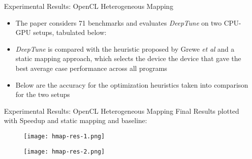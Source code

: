 \documentclass[10pt]{beamer}
\begin{document}
\begin{frame}{Experimental Results: OpenCL Heterogeneous Mapping}
\begin{itemize}
\item<1->{The paper considers 71 benchmarks and evaluates \emph{DeepTune} on two CPU-GPU setups, tabulated below:}
\end{itemize}
\begin{itemize}
\item<2->{\emph{DeepTune} is compared with the heuristic proposed by Grewe \textit{et al} and a static mapping approach, which selects the device the device that gave the best average case performance across all programs}
\item<3->{Below are the accuracy for the optimization heuristics taken into comparison for the two setups}
\end{itemize}
\end{frame}

\begin{frame}{Experimental Results: OpenCL Heterogeneous Mapping}
Final Results plotted with Speedup and static mapping and baseline:
\begin{figure}[H]
\centering
\texttt{[image: hmap-res-1.png]}
\end{figure}
\vspace{-2mm}
\begin{figure}[H]
\centering
\texttt{[image: hmap-res-2.png]}
\end{figure}
\end{frame}
\end{document}
